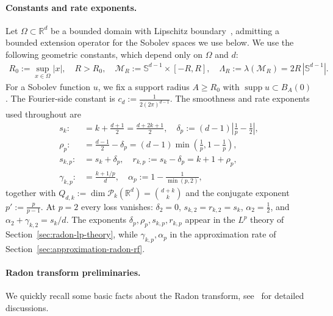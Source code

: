 \documentclass[12pt]{article}
\numberwithin{equation}{section}
\numberwithin{figure}{section}
\numberwithin{equation}{section}
\newcommand{\R}{\mathbb{R}}
\newcommand{\Sph}{\mathbb S}
\newcommand{\Pcal}{\mathcal P}
\newcommand{\MR}{\mathcal M_R}
\newcommand{\abs}[1]{\left|#1\right|}
\DeclareMathOperator{\supp}{supp}
\begin{document}
\paragraph{Constants and rate exponents.}
Let $\Omega \subset \R^d$ be a bounded domain with Lipschitz boundary~\cite{adams_SobolevSpaces_2008},
admitting a bounded extension operator for the Sobolev spaces we use below.
We use the following geometric constants, which depend only on $\Omega$ and $d$:
\begin{align*}
    R_0:=\sup_{x\in\Omega}\abs x,
    \quad R>R_0,
    \quad
    \MR:=\Sph^{d-1}\times[-R,R],
    \quad
    \Lambda_R:=\lambda(\MR)=2R\,\abs{\Sph^{d-1}}.
\end{align*}
For a Sobolev function $u$, we fix a support radius
$A\ge R_0$ with $\supp u\subset B_A(0)$. The Fourier-side constant
is $c_d:=\tfrac{1}{2(2\pi)^{d-1}}$. The smoothness and rate exponents used
throughout are
\begin{align*}
    s_k:&=k+\frac{d+1}{2}=\frac{d+2k+1}{2},
    \quad
    \delta_p:=(d-1)\abs{\frac1p-\frac12}, \nonumber\\
    \rho_p:&=\frac{d-1}{2}-\delta_p=(d-1)\min\!\left(\frac1p,1-\frac1p\right),
    \\
    s_{k,p}:&=s_k+\delta_p,
    \quad
    r_{k,p}:=s_k-\delta_p=k+1+\rho_p, \nonumber\\
    \gamma_{k,p}:&=\frac{k+1/p}{d},
    \quad
    \alpha_p:=1-\frac1{\min(p,2)},
\end{align*}
together with $Q_{d,k}:=\dim\Pcal_k(\R^d)=\binom{d+k}{k}$ and the conjugate
exponent $p':=\tfrac{p}{p-1}$. At $p=2$ every loss vanishes: $\delta_2=0$,
$s_{k,2}=r_{k,2}=s_k$, $\alpha_2=\tfrac12$, and $\alpha_2+\gamma_{k,2}=s_k/d$.
The exponents $\delta_p,\rho_p,s_{k,p},r_{k,p}$ appear in the $L^p$ theory of
Section~\ref{sec:radon-lp-theory}, while $\gamma_{k,p},\alpha_p$ in the
approximation rate of Section~\ref{sec:approximation-radon-rf}.


\paragraph{Radon transform preliminaries.}
We quickly recall some basic facts about the Radon transform,
see~\cite{ludwig_radontransformeuclidean_1966,helgason_integralgeometryradon_2010,
parhi_banachspacerepresenter_2021,parhi_distributionalextensioninvertibility_2024}
for detailed discussions.
\end{document}

